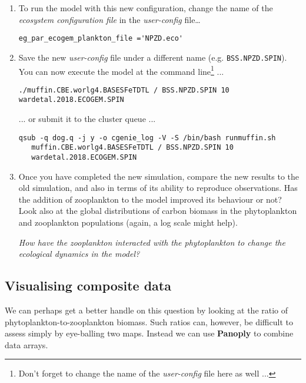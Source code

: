 \documentclass[11pt,fleqn]{book} %
\begin{document}
\begin{enumerate}[noitemsep]
\vspace{1mm}
\item  To run the model with this new configuration, change the name of the \textit{ecosystem configuration file} in the \textit{user-config} file\dots
\small\begin{verbatim}
eg_par_ecogem_plankton_file ='NPZD.eco'
\end{verbatim}\normalsize

\vspace{1mm}
\item Save the new \textit{user-config} file under a different name (e.g. \texttt{BSS.NPZD.SPIN}). You can now execute the model at the command line\footnote{Don't forget to change the name of the \textit{user-config} file here as well ...} ...
\small\begin{verbatim}
./muffin.CBE.worlg4.BASESFeTDTL / BSS.NPZD.SPIN 10 wardetal.2018.ECOGEM.SPIN
\end{verbatim}\normalsize
... or submit it to the cluster queue ...
\small\begin{verbatim}
qsub -q dog.q -j y -o cgenie_log -V -S /bin/bash runmuffin.sh
   muffin.CBE.worlg4.BASESFeTDTL / BSS.NPZD.SPIN 10
   wardetal.2018.ECOGEM.SPIN
\end{verbatim}\normalsize

\vspace{1mm}
\item Once you have completed the new simulation, compare the new results to the old simulation, and also in terms of its ability to reproduce observations. Has the addition of zooplankton to the model improved its behaviour or not? Look also at the global distributions of carbon biomass in the phytoplankton and zooplankton populations (again, a log scale might help).

\vspace{1mm}
\textit{How have the zooplankton interacted with the phytoplankton to change the ecological dynamics in the model?}

\end{enumerate}
\vspace{2mm}


\subsection{Visualising composite data}

We can perhaps get a better handle on this question by looking at the ratio of phytoplankton-to-zooplankton biomass. Such ratios can, however, be difficult to assess simply by eye-balling two maps. Instead we can use \textbf{Panoply} to combine data arrays.
\end{document}
